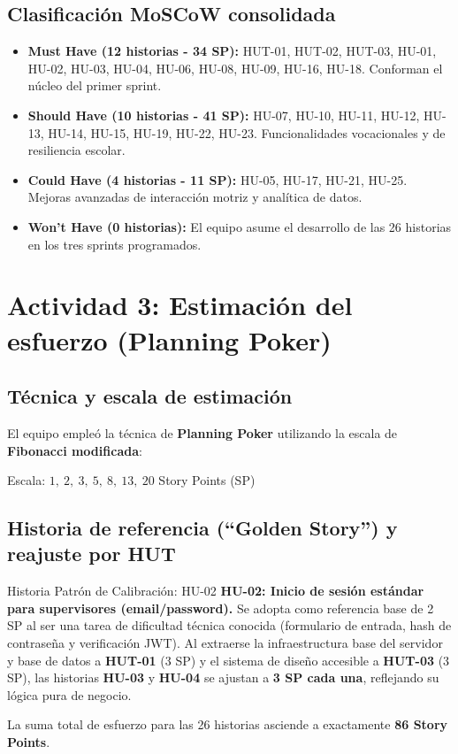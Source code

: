 \documentclass[11pt,a4paper]{article}
\newcommand{\hl}[1]{\textcolor{gblue}{\textbf{#1}}}
\begin{document}
\subsection{Clasificación MoSCoW consolidada}
\begin{itemize}
\item \textbf{Must Have (12 historias - 34 SP):} HUT-01, HUT-02, HUT-03, HU-01, HU-02, HU-03, HU-04, HU-06, HU-08, HU-09, HU-16, HU-18. Conforman el núcleo del primer sprint.
\item \textbf{Should Have (10 historias - 41 SP):} HU-07, HU-10, HU-11, HU-12, HU-13, HU-14, HU-15, HU-19, HU-22, HU-23. Funcionalidades vocacionales y de resiliencia escolar.
\item \textbf{Could Have (4 historias - 11 SP):} HU-05, HU-17, HU-21, HU-25. Mejoras avanzadas de interacción motriz y analítica de datos.
\item \textbf{Won't Have (0 historias):} El equipo asume el desarrollo de las 26 historias en los tres sprints programados.
\end{itemize}

\section{Actividad 3: Estimación del esfuerzo (Planning Poker)}
\subsection{Técnica y escala de estimación}
El equipo empleó la técnica de \hl{Planning Poker} utilizando la escala de \textbf{Fibonacci modificada}:

\begin{center}Escala: $1,\ 2,\ 3,\ 5,\ 8,\ 13,\ 20$ Story Points (SP)\end{center}

\subsection{Historia de referencia (``Golden Story'') y reajuste por HUT}
\begin{verde}{Historia Patrón de Calibración: HU-02}
\textbf{HU-02: Inicio de sesión estándar para supervisores (email/password).} Se adopta como referencia base de 2 SP al ser una tarea de dificultad técnica conocida (formulario de entrada, hash de contraseña y verificación JWT). Al extraerse la infraestructura base del servidor y base de datos a \textbf{HUT-01} (3 SP) y el sistema de diseño accesible a \textbf{HUT-03} (3 SP), las historias \textbf{HU-03} y \textbf{HU-04} se ajustan a \textbf{3 SP cada una}, reflejando su lógica pura de negocio.
\end{verde}
La suma total de esfuerzo para las 26 historias asciende a exactamente \hl{86 Story Points}.
\end{document}
